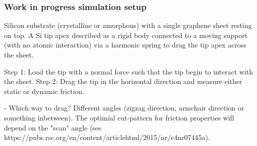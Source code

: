 \subsubsection*{Work in progress simulation setup}
Silicon substrate (crystalline or amorphous) with a single graphene sheet resting on top. A Si tip apex described as a rigid body connected to a moving support (with no atomic interaction) via a harmonic spring to drag the tip apex across the sheet. \par
Step 1: Load the tip with a normal force such that the tip begin to interact with the sheet. Step 2: Drag the tip in the horizontal direction and measure either static or dynamic friction. 

- Which way to drag? Different angles (zigzag direction, armchair direction or something inbetween). The optimial cut-pattern for friction properties will depend on the "scan" angle (see https://pubs.rsc.org/en/content/articlehtml/2015/nr/c4nr07445a). 